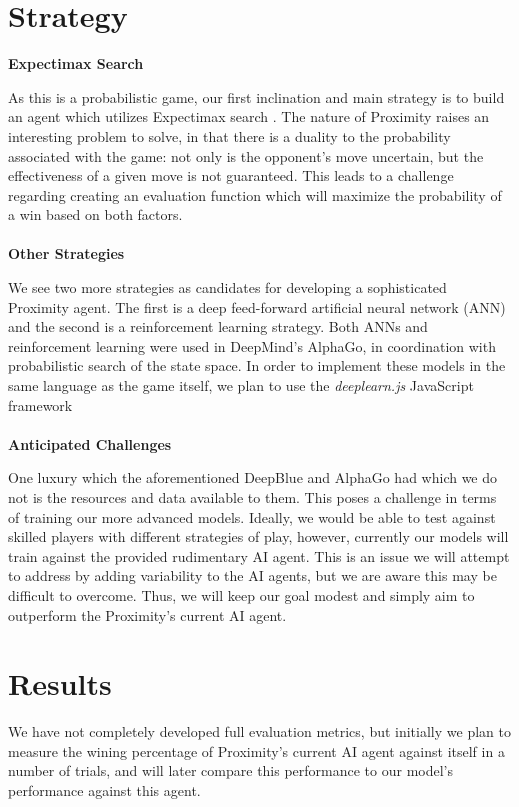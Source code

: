 \documentclass[10pt,letter]{article}
\begin{document}
\begin{multicols}{2}
\section*{Strategy}
\textbf{Expectimax Search}
\par
As this is a probabilistic game, our first inclination and main strategy is to build an agent which utilizes Expectimax search \cite{aima}. The nature of Proximity raises an interesting problem to solve, in that there is a duality to the probability associated with the game: not only is the opponent's move uncertain, but the effectiveness of a given move is not guaranteed. This leads to a challenge regarding creating an evaluation function which will maximize the probability of a win based on both factors.\\ \\
\textbf{Other Strategies}\\ 
\par
We see two more strategies as candidates for developing a sophisticated Proximity agent. The first is a deep feed-forward artificial neural network (ANN) \cite{bishop_2006} and the second is a reinforcement learning strategy\cite{rein}. Both ANNs and reinforcement learning were used in DeepMind's AlphaGo, in coordination with probabilistic search of the state space. In order to implement these models in the same language as the game itself, we plan to use the \emph{deeplearn.js} JavaScript framework \cite{deeplearn.js} \\ \\
\textbf{Anticipated Challenges} \\ 
\par
One luxury which the aforementioned DeepBlue and AlphaGo had which we do not is the resources and data available to them. This poses a challenge in terms of training our more advanced models. Ideally, we would be able to test against skilled players with different strategies of play, however, currently our models will train against the provided rudimentary AI agent. This is an issue we will attempt to address by adding variability to the AI agents, but we are aware this may be difficult to overcome. Thus, we will keep our goal modest and simply aim to outperform the Proximity's current AI agent.
\section*{Results}
\par
We have not completely developed full evaluation metrics, but initially we plan to measure the wining percentage of Proximity's current AI agent against itself in a number of trials, and will later compare this performance to our model's performance against this agent.
\end{multicols}
\pagebreak
\printbibliography
\end{document}
